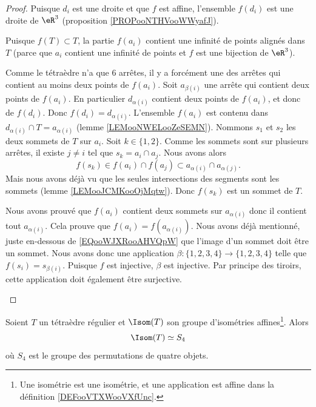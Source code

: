 \begin{proof}
	Puisque \( d_i\) est une droite et que \( f\) est affine, l'ensemble \( f(d_i)\) est une droite de \( \eR^3\) (proposition \ref{PROPooNTHVooWWyafJ}).

	\begin{subproof}
		Puisque \( f(T)\subset T\), la partie \( f(a_i)\) contient une infinité de points alignés dans \( T\) (parce que \( a_i\) contient une infinité de points et \( f\) est une bijection de \( \eR^3\)).

		Comme le tétraèdre n'a que \( 6\) arrêtes, il y a forcément une des arrêtes qui contient au moins deux points de \( f(a_i)\). Soit \( a_{\beta(i)}\) une arrête qui contient deux points de \( f(a_i)\). En particulier \( d_{\alpha(i)}\) contient deux points de \( f(a_i)\), et donc de \( f(d_i)\). Donc \( f(d_i)=d_{\alpha(i)}\).
		L'ensemble \( f(a_i)\) est contenu dans \( d_{\alpha(i)}\cap T=a_{\alpha(i)}\) (lemme \ref{LEMooNWELooZeSEMN}). Nommons \( s_1\) et \( s_2\) les deux sommets de \( T\) sur \( a_i\). Soit \( k\in\{ 1,2 \}\). Comme les sommets sont sur plusieurs arrêtes, il existe \( j\neq i\) tel que \( s_k=a_i\cap a_j\). Nous avons alors
		\begin{equation}        \label{EQooWJXRooAHVQpW}
			f(s_k)\in f(a_i)\cap f(a_j)\subset a_{\alpha(i)}\cap a_{\alpha(j)}.
		\end{equation}
		Mais nous avons déjà vu que les seules intersections des segments sont les sommets (lemme \ref{LEMooJCMKooOjMqtw}). Donc \( f(s_k)\) est un sommet de \( T\).

		Nous avons prouvé que \( f(a_i)\) contient deux sommets sur \( a_{\alpha(i)}\) donc il contient tout \( a_{\alpha(i)}\). Cela prouve que \( f(a_i)=f(a_{\alpha(i)})\).
		Nous avons déjà mentionné, juste en-dessous de \eqref{EQooWJXRooAHVQpW} que l'image d'un sommet doit être un sommet. Nous avons donc une application \( \beta\colon \{ 1,2,3,4 \}\to \{ 1,2,3,4 \}\) telle que \( f(s_i)=s_{\beta(i)}\). Puisque \( f\) est injective, \( \beta\) est injective. Par principe des tiroirs, cette application doit également être surjective.
	\end{subproof}
\end{proof}

\begin{proposition}       \label{PROPooVNLKooOjQzCj}
	Soient \( T\) un tétraèdre régulier et \( \Isom(T)\) son groupe d'isométries affines\footnote{Une isométrie est une isométrie, et une application est affine dans la définition \ref{DEFooVTXWooVXfUnc}.}. Alors
	\begin{equation}
		\Isom(T)\simeq S_4
	\end{equation}
	où \( S_4\) est le groupe des permutations de quatre objets.
\end{proposition}

